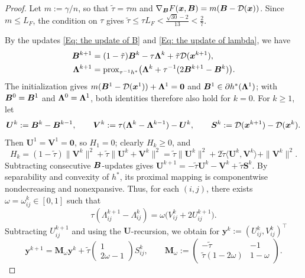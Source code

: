 \begingroup\color{blue}
\begin{proof}
    Let $m:=\gamma/n$, so that $\tilde\tau=\tau m$ and $\nabla_{\bm{B}}F(\bm{x},\bm{B})=m(\bm{B}-\mathcal{D}(\bm{x}))$. Since $m\le L_F$, the condition on $\tau$ gives $\tilde\tau\le\tau L_F<\frac{\sqrt{30}-2}{13}<\frac27$.

    By the updates \eqref{Eq: the update of B} and \eqref{Eq: the update of lambda}, we have
    \begin{align*}
        \bm{B}^{k+1}&=(1-\tilde\tau)\bm{B}^k-\tau\bm{\Lambda}^k+\tilde\tau\mathcal{D}(\bm{x}^{k+1}),\\
        \bm{\Lambda}^{k+1}&=\operatorname{prox}_{\tau^{-1}h^*}\bigl(\bm{\Lambda}^k+\tau^{-1}(2\bm{B}^{k+1}-\bm{B}^k)\bigr).
    \end{align*}
    The initialization gives $m(\bm{B}^1-\mathcal{D}(\bm{x}^1))+\bm{\Lambda}^1=\bm{0}$ and $\bm{B}^1\in\partial h^*(\bm{\Lambda}^1)$; with $\bm{B}^0=\bm{B}^1$ and $\bm{\Lambda}^0=\bm{\Lambda}^1$, both identities therefore also hold for $k=0$. For $k\ge1$, let
    \begin{equation*}
        \bm{U}^k:=\bm{B}^k-\bm{B}^{k-1},\qquad
        \bm{V}^k:=\tau(\bm{\Lambda}^k-\bm{\Lambda}^{k-1})-\bm{U}^k,\qquad
        \bm{S}^k:=\mathcal{D}(\bm{x}^{k+1})-\mathcal{D}(\bm{x}^k).
    \end{equation*}
    Then $\bm{U}^1=\bm{V}^1=\bm{0}$, so $H_1=0$; clearly $H_k\ge0$, and
    \begin{equation*}
        H_k=(1-\tilde\tau)\|\bm{V}^k\|^2+\tilde\tau\|\bm{U}^k+\bm{V}^k\|^2=\tilde\tau\|\bm{U}^k\|^2+2\tilde\tau\langle\bm{U}^k,\bm{V}^k\rangle+\|\bm{V}^k\|^2.
    \end{equation*}
    Subtracting consecutive $\bm{B}$-updates gives $\bm{U}^{k+1}=-\tilde\tau\bm{U}^k-\bm{V}^k+\tilde\tau\bm{S}^k$. By separability and convexity of $h^*$, its proximal mapping is componentwise nondecreasing and nonexpansive. Thus, for each $(i,j)$, there exists $\omega=\omega_{ij}^k\in[0,1]$ such that
    \[
        \tau(\Lambda_{ij}^{k+1}-\Lambda_{ij}^k)=\omega\bigl(V_{ij}^k+2U_{ij}^{k+1}\bigr).
    \]
    Subtracting $U_{ij}^{k+1}$ and using the $\bm{U}$-recursion, we obtain for $\bm{y}^k:=(U_{ij}^k,V_{ij}^k)^\top$
    \begin{equation}
        \label{Eq: increment dynamics}
        \bm{y}^{k+1}=\bm{M}_\omega\bm{y}^k+\tilde\tau\begin{pmatrix}1\\2\omega-1\end{pmatrix}S_{ij}^k,\qquad
        \bm{M}_\omega:=\begin{pmatrix}-\tilde\tau&-1\\ \tilde\tau (1-2\omega)&1-\omega\end{pmatrix}.
    \end{equation}
   


\end{proof}
